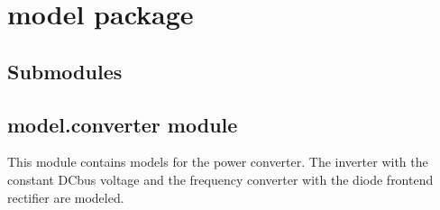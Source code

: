 \documentclass[letterpaper,10pt,english]{sphinxmanual}
\begin{document}
\section{model package}
\label{\detokenize{model:model-package}}\label{\detokenize{model::doc}}

\subsection{Submodules}
\label{\detokenize{model:submodules}}

\subsection{model.converter module}
\label{\detokenize{model:module-model.converter}}\label{\detokenize{model:model-converter-module}}
\sphinxAtStartPar
This module contains models for the power converter. The inverter with the
constant DC\sphinxhyphen{}bus voltage and the frequency converter with the diode
front\sphinxhyphen{}end rectifier are modeled.
\end{document}
